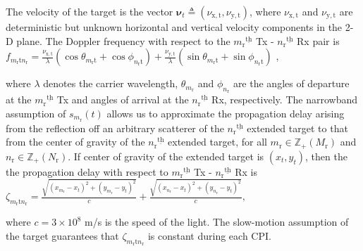 \documentclass[10pt,journal]{IEEEtran}
\newcommand{\paren}[1]{\left({#1}\right)}
\newcommand{\ith}[1]    {{#1}^{\underline{\text{th}}}}
\newcommand{\rr}{_\mathrm{r}}
\newcommand{\target}{\mathrm{t}}
\theoremstyle{definition}
\begin{document}
The velocity of the target is the vector  $\boldsymbol{\nu}_{t}\triangleq\left(\nu_\mathrm{\mathrm{x},t},\nu_\mathrm{\mathrm{y},t} \right)$, where $\nu_\mathrm{\mathrm{x},t}$ and $\nu_\mathrm{\mathrm{y},t}$ are deterministic but unknown horizontal and vertical velocity components in the 2-D plane. The Doppler frequency with respect to the $\ith{m\rr}$ Tx - $\ith{n\rr}$ Rx pair is $f_{m_\mathrm{r}\target n_\mathrm{r}} = \frac{\nu_\mathrm{\mathrm{x},t}}{\lambda}(\cos\theta_{m_\mathrm{r}\target}+\cos\phi_{n_\mathrm{r}\target})+\frac{\nu_\mathrm{\mathrm{y},\target}}{\lambda}(\sin\theta_{m_\mathrm{r}\target}+\sin\phi_{n_\mathrm{r}\target})$ \cite{hongbin_movingtarget},

where $\lambda$ denotes the carrier wavelength, $\theta_{m_\mathrm{r}}$ and $\phi_{n_\mathrm{r}}$ are the angles of departure at the $\ith{m_\mathrm{r}}$ Tx and angles of arrival at the $\ith{n_\mathrm{r}}$ Rx, respectively. %
The narrowband assumption of $s_{m\rr}(t)$ allows us to approximate the propagation delay arising from the reflection off an arbitrary scatterer of the $\ith{n_\mathrm{r}}$ extended target to that from the center of gravity of the $\ith{n_\mathrm{r}}$ extended target, for all $m_\mathrm{r}\in\mathbb{Z}_{+}(M_\mathrm{r})$ and $n_\mathrm{r}\in\mathbb{Z}_{+}(N_\mathrm{r})$\cite{haimovich2008mimo}. If center of gravity of the extended target is $(x_{t},y_{t})$, then the the propagation delay with respect to $\ith{m\rr}$ Tx - $\ith{n\rr}$ Rx  is
$\zeta_{m\rr \target n\rr}=\frac{\sqrt{\paren{x_{m\rr}-x_{t}}^2+\paren{y_{m\rr}-y_{t}}^2}}{c}
		+\frac{\sqrt{\paren{x_{n\rr}-x_{t}}^2+\paren{y_{n\rr}-y_{t}}^2}}{c},$

where $c=3\times 10^8$ m/s is the speed of the light. The slow-motion assumption of the target guarantees that $\zeta_{m\rr \target n\rr }$ is constant during each CPI. %
\end{document}
